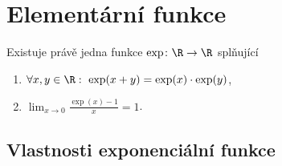 \section{Elementární funkce}
\begin{veta}\label{veta4.1}
Existuje právě jedna funkce $\exp\colon\R\to\R$ splňující
\begin{enumerate}
  \item[(E1)] $\forall x,y\in\R:\ \exp(x+y)=\exp(x)\cdot\exp(y)$,
  \item[(E2)] $\displaystyle \lim_{x\to 0} \frac{\exp(x)-1}{x}=1$.
\end{enumerate}
\end{veta}

\subsection{Vlastnosti exponenciální funkce}
